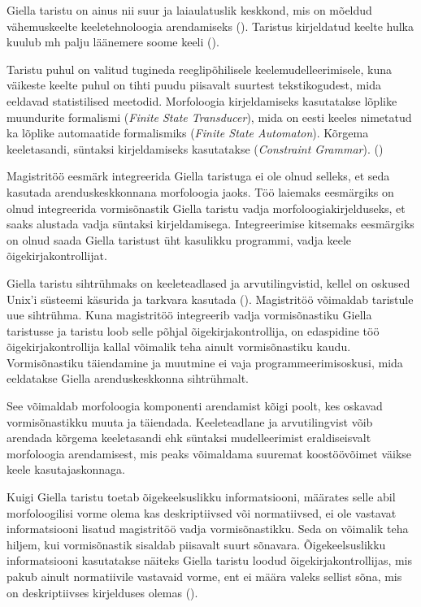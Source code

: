 \documentclass[12pt,a4paper]{article}
\begin{document}
Giella taristu on ainus nii suur ja laia\-ulatuslik keskkond, mis on mõeldud vähemus\-keelte keele\-tehnoloogia arendamiseks (\cite[346]{moshagen_building_2013}). Taristus kirjeldatud keelte hulka kuulub mh palju lääne\-mere soome keeli (\cite[349]{moshagen_building_2013}).

Taristu puhul on valitud tugineda reegli\-põhilisele keele\-mudelleerimisele, kuna väikeste keelte puhul on tihti puudu piisavalt suurtest teksti\-kogudest, mida eeldavad statistilised meetodid. Morfoloogia kirjeldamiseks kasutatakse lõplike muundurite formalismi (\textit{Finite State Transducer}), mida on eesti keeles nimetatud ka lõplike automaatide formalismiks (\textit{Finite State Automaton}). Kõrgema keele\-tasandi, süntaksi kirjeldamiseks kasutatakse (\textit{Constraint Grammar}). (\cite[346]{moshagen_building_2013})

Magistritöö eesmärk integreerida Giella taristuga ei ole olnud selleks, et seda kasutada arendus\-keskkonnana morfoloogia jaoks. Töö laiemaks eesmärgiks on olnud integreerida vormi\-sõnastik Giella taristu vadja morfoloogia\-kirjelduseks, et saaks alustada vadja süntaksi kirjeldamisega. Integreerimise kitsemaks eesmärgiks on olnud saada Giella taristust üht kasulikku programmi, vadja keele õige\-kirja\-kontrollijat. 

Giella taristu sihtrühmaks on keeleteadlased ja arvuti\-lingvistid, kellel on oskused Unix'i süsteemi käsurida ja tarkvara kasutada (\cite[347]{moshagen_building_2013}). Magistri\-töö võimaldab taristule uue sihtrühma. Kuna magistri\-töö integreerib vadja vormi\-sõnastiku Giella taristusse ja taristu loob selle põhjal õige\-kirja\-kontrollija, on edas\-pidine töö õige\-kirja\-kontrollija kallal võimalik teha ainult vormi\-sõnastiku kaudu. Vormi\-sõnastiku täiendamine ja muutmine ei vaja programmeerimis\-oskusi, mida eeldatakse Giella arendus\-keskkonna siht\-rühmalt. %

See võimaldab morfoloogia komponenti arendamist kõigi poolt, kes oskavad vormisõnastikku muuta ja täiendada. Keele\-teadlane ja arvuti\-lingvist võib arendada kõrgema keele\-tasandi ehk süntaksi mudelleerimist eraldi\-seisvalt morfoloogia arendamisest, mis peaks võimaldama suuremat koos\-töö\-võimet väikse keele kasutajas\-konnaga.

Kuigi Giella taristu toetab õige\-keelsuslikku informatsiooni, määrates selle abil morfoloogilisi vorme olema kas deskriptiivsed või normatiivsed, ei ole vastavat informatsiooni lisatud magistritöö vadja vormi\-sõnastikku. Seda on võimalik teha hiljem, kui vormi\-sõnastik sisaldab piisavalt suurt sõna\-vara. Õige\-keelsuslikku informatsiooni kasutatakse näiteks Giella taristu loodud õige\-kirja\-kontrollijas, mis pakub ainult normatiivile vastavaid vorme, ent ei määra valeks sellist sõna, mis on deskriptiivses kirjelduses olemas (\cite{moshagen_building_2013}). %
\end{document}

